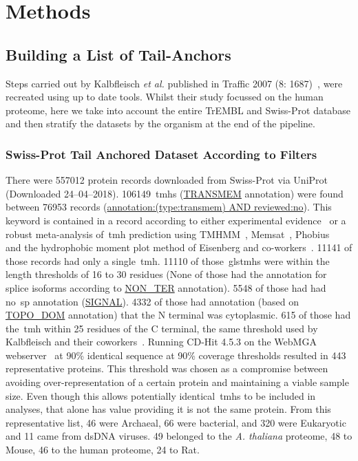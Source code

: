 \section{Methods}

\subsection{Building a List of Tail-Anchors}
Steps carried out by Kalbfleisch \textit{et al.} published in Traffic 2007 (8: 1687)~\cite{Kalbfleisch2007}, were recreated using up to date tools. Whilst their study focussed on the human proteome, here we take into account the entire TrEMBL and Swiss-Prot database and then stratify the datasets by the organism at the end of the pipeline.

\subsubsection{Swiss-Prot Tail Anchored Dataset According to Filters}
There were 557012 protein records downloaded from Swiss-Prot via UniProt~\cite{TheUniProtConsortium2014} (Downloaded 24--04--2018).
106149~\gls{tmh}s (\url{TRANSMEM} annotation) were found between 76953 records (\url{annotation:(type:transmem) AND reviewed:no}).
This keyword is contained in a record according to either experimental evidence~\cite{TheUniProtConsortium2014} or a robust meta-analysis of~\gls{tmh} prediction using TMHMM~\cite{Krogh2001}, Memsat~\cite{Jones2007}, Phobius~\cite{Kall2004,Kall2007} and the hydrophobic moment plot method of Eisenberg and co-workers~\cite{Eisenberg1984}.
11141 of those records had only a single~\gls{tmh}.
11110 of those~gls{tmh}s were within the length thresholds of 16 to 30 residues (None of those had the annotation for splice isoforms according to \url{NON_TER} annotation).
5548 of those had had no~\gls{sp} annotation (\url{SIGNAL}).
4332 of those had annotation (based on \url{TOPO_DOM} annotation) that the N terminal was cytoplasmic.
615 of those had the~\gls{tmh} within 25 residues of the C terminal, the same threshold used by Kalbfleisch and their coworkers~\cite{Kalbfleisch2007}.
Running CD-Hit 4.5.3 on the WebMGA webserver~\cite{Huang2010, Wu2011} at 90\% identical sequence at 90\% coverage thresholds resulted in 443 representative proteins.
This threshold was chosen as a compromise between avoiding over-representation of a certain protein and maintaining a viable sample size.
Even though this allows potentially identical~\gls{tmh}s to be included in analyses, that alone has value providing it is not the same protein.
From this representative list, 46 were Archaeal, 66 were bacterial, and 320 were Eukaryotic and 11 came from dsDNA viruses.
49 belonged to the \textit{A. thaliana} proteome, 48 to Mouse, 46 to the human proteome, 24 to Rat.

